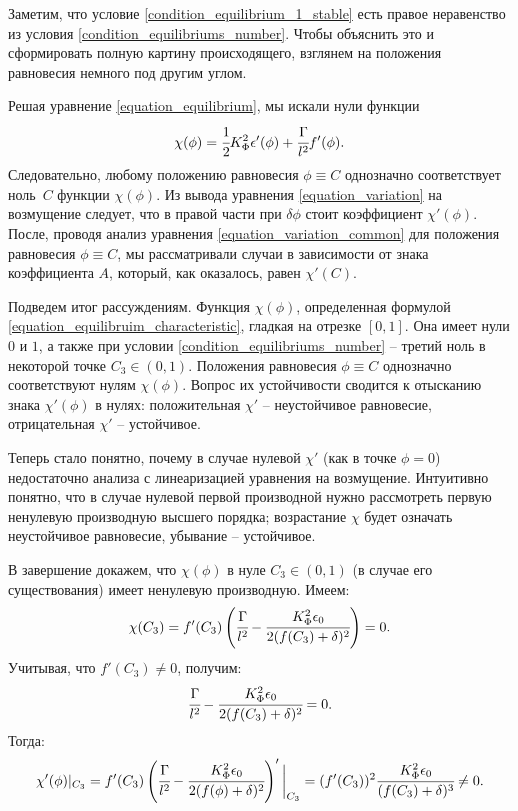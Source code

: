 \documentclass[a4paper,12pt]{article}
\theoremstyle{plain}
\theoremstyle{definition}
\begin{document}
Заметим, что условие \eqref{condition_equilibrium_1_stable} есть правое неравенство из условия \eqref{condition_equilibriums_number}. Чтобы объяснить это и сформировать полную картину происходящего, взглянем на положения равновесия немного под другим углом.

Решая уравнение \eqref{equation_equilibrium}, мы искали нули функции 
\begin{equation}
    \chi(\phi) = \cfrac{1}{2} K_\Phi^2 \epsilon'(\phi) + \cfrac{\Gamma}{l^2} f'(\phi) \text{.}
    \label{equation_equilibruim_characteristic}
\end{equation}
Следовательно, любому положению равновесия $\phi \equiv C$ однозначно соответствует ноль~$C$ функции $\chi(\phi)$. Из вывода уравнения \eqref{equation_variation} на возмущение следует, что в правой части при $\delta \phi$ стоит коэффициент $\chi'(\phi)$. После, проводя анализ уравнения \eqref{equation_variation_common} для положения равновесия $\phi \equiv C$, мы рассматривали случаи в зависимости от знака коэффициента $A$, который, как оказалось, равен $\chi'(C)$.

Подведем итог рассуждениям. Функция $\chi(\phi)$, определенная формулой \eqref{equation_equilibruim_characteristic}, гладкая на отрезке $[0, 1]$. Она имеет нули $0$ и $1$, а также при условии \eqref{condition_equilibriums_number} -- третий ноль в некоторой точке $C_3 \in (0, 1)$. Положения равновесия $\phi \equiv C$ однозначно соответствуют нулям $\chi(\phi)$. Вопрос их устойчивости сводится к отысканию знака $\chi'(\phi)$ в нулях: положительная $\chi'$ -- неустойчивое равновесие, отрицательная $\chi'$ -- устойчивое.

Теперь стало понятно, почему в случае нулевой $\chi'$ (как в точке $\phi = 0$) недостаточно анализа с линеаризацией уравнения на возмущение. Интуитивно понятно, что в случае нулевой первой производной нужно рассмотреть первую ненулевую производную высшего порядка; возрастание $\chi$ будет означать неустойчивое равновесие, убывание -- устойчивое.

В завершение докажем, что $\chi(\phi)$ в нуле $C_3 \in (0, 1)$ (в случае его существования) имеет ненулевую производную. Имеем:
$$\chi(C_3) = f'(C_3) \left( \cfrac{\Gamma}{l^2} - \cfrac{K_\Phi^2 \epsilon_0}{2 (f(C_3) + \delta)^2} \right) = 0 \text{.}$$
Учитывая, что $f'(C_3) \ne 0$, получим:
$$\cfrac{\Gamma}{l^2} - \cfrac{K_\Phi^2 \epsilon_0}{2 (f(C_3) + \delta)^2} = 0 \text{.}$$
Тогда:
$$\chi'(\phi)|_{C_3} = f'(C_3) \left( \cfrac{\Gamma}{l^2} - \cfrac{K_\Phi^2 \epsilon_0}{2 (f(\phi) + \delta)^2} \right) ' \bigg|_{C_3} = (f'(C_3))^2 \cfrac{K_\Phi^2 \epsilon_0}{(f(C_3) + \delta)^3} \ne 0 \text{.}$$
\end{document}
